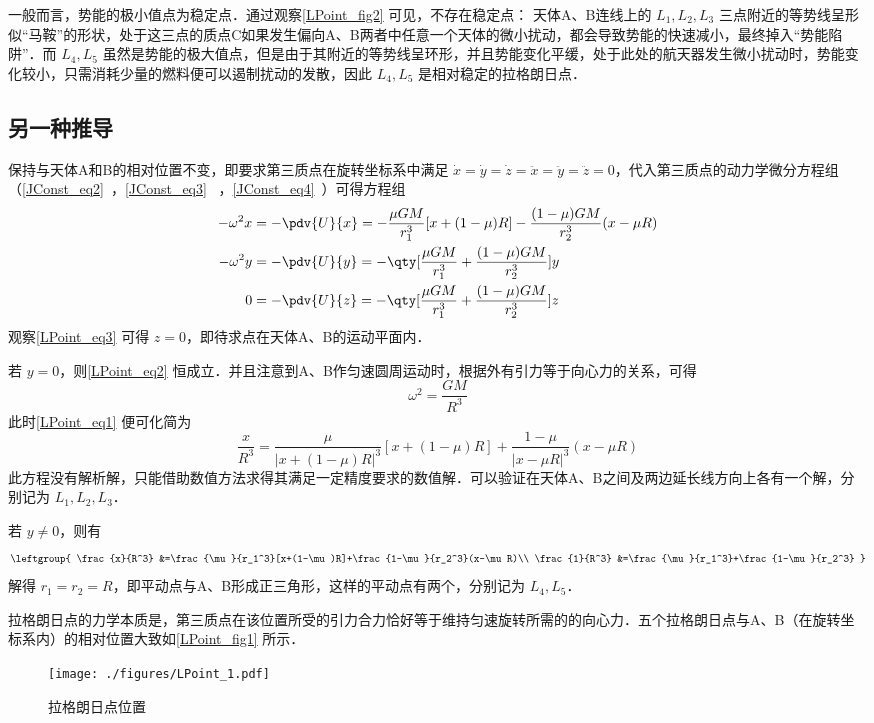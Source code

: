 一般而言，势能的极小值点为稳定点．通过观察\autoref{LPoint_fig2} 可见，不存在稳定点： 天体A、B连线上的 $L_1,L_2,L_3$ 三点附近的等势线呈形似“马鞍”的形状，处于这三点的质点C如果发生偏向A、B两者中任意一个天体的微小扰动，都会导致势能的快速减小，最终掉入“势能陷阱”．而 $L_4,L_5$ 虽然是势能的极大值点，但是由于其附近的等势线呈环形，并且势能变化平缓，处于此处的航天器发生微小扰动时，势能变化较小，只需消耗少量的燃料便可以遏制扰动的发散，因此 $L_4,L_5$ 是相对稳定的拉格朗日点．  

\subsection{另一种推导}

保持与天体A和B的相对位置不变，即要求第三质点在旋转坐标系中满足 $\dot{x}=\dot{y}=\dot{z}=\ddot{x}=\ddot{y}=\ddot{z}=0$，代入第三质点的动力学微分方程组（\autoref{JConst_eq2}~，\autoref{JConst_eq3}~ ，\autoref{JConst_eq4}~）可得方程组
\begin{align}
-\omega^2 x &=- \pdv{U}{x}=-\frac{\mu GM}{r_1^3}[x+(1-\mu)R]-\frac{(1-\mu)GM}{r_2^3}(x-\mu R)\label{LPoint_eq1}\\
-\omega^2 y &=- \pdv{U}{y}=-\qty[\frac{\mu GM}{r_1^3}+\frac{(1-\mu)GM}{r_2^3}]y\label{LPoint_eq2}\\
0 &=- \pdv{U}{z} =-\qty[\frac{\mu GM}{r_1^3}+\frac{(1-\mu)GM}{r_2^3}]z\label{LPoint_eq3}
\end{align}
观察\autoref{LPoint_eq3} 可得 $z=0$，即待求点在天体A、B的运动平面内．

若 $y=0$，则\autoref{LPoint_eq2} 恒成立．并且注意到A、B作匀速圆周运动时，根据外有引力等于向心力的关系，可得
\begin{equation}%
\omega^2 =\frac{GM}{R^3}
\end{equation}
此时\autoref{LPoint_eq1} 便可化简为
\begin{equation}%
\frac{x}{R^3} =\frac{\mu}{|x+(1-\mu)R|^3}[x+(1-\mu)R]+\frac{1-\mu}{|x-\mu R|^3}(x-\mu R)
\end{equation}
此方程没有解析解，只能借助数值方法求得其满足一定精度要求的数值解．可以验证在天体A、B之间及两边延长线方向上各有一个解，分别记为 $L_1,L_2,L_3$．

若 $y\neq 0$，则有
\begin{equation}%
\leftgroup{
\frac{x}{R^3} &=\frac{\mu}{r_1^3}[x+(1-\mu)R]+\frac{1-\mu}{r_2^3}(x-\mu R)\\
\frac{1}{R^3} &=\frac{\mu}{r_1^3}+\frac{1-\mu}{r_2^3}
}
\end{equation}
解得 $r_1=r_2=R$，即平动点与A、B形成正三角形，这样的平动点有两个，分别记为 $L_4,L_5$．

拉格朗日点的力学本质是，第三质点在该位置所受的引力合力恰好等于维持匀速旋转所需的的向心力．五个拉格朗日点与A、B（在旋转坐标系内）的相对位置大致如\autoref{LPoint_fig1} 所示．
\begin{figure}[ht]
\centering
\texttt{[image: ./figures/LPoint\_1.pdf]}
\caption{拉格朗日点位置} \label{LPoint_fig1}
\end{figure}
